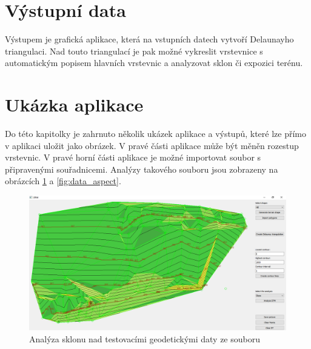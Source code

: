 \documentclass[a4paper,11pt,twoside]{article}
\begin{document}
\section{Výstupní data}
Výstupem je grafická aplikace, která na vstupních datech vytvoří Delaunayho triangulaci. Nad touto triangulací je pak možné vykreslit vrstevnice s automatickým popisem hlavních vrstevnic a analyzovat sklon či expozici terénu.

\newpage
{}

\vspace*{-1cm}
\section{Ukázka aplikace}
\noindent
\large
Do této kapitolky je zahrnuto několik ukázek aplikace a výstupů, které lze přímo v aplikaci uložit jako obrázek. V pravé části aplikace může být měněn rozestup vrstevnic. V pravé horní části aplikace je možné importovat soubor s připravenými souřadnicemi. Analýzy takového souboru jsou zobrazeny na obrázcích \ref{fig:data_slope} a \ref{fig:data_aspect}.

\vspace{0.2cm}
\begin{figure}[hbt!] 
\begin{center}
\includegraphics[width=13cm]{pictures/data_slope.PNG} 
\caption[Analýza sklonu nad testovacími geodetickými daty ze souboru]{Analýza sklonu nad testovacími geodetickými daty ze souboru}
\label{fig:data_slope}
\end{center}
\end{figure}
\end{document}
